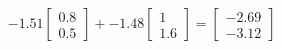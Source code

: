 \documentclass[preview]{standalone}
\begin{document}
\begin{align*}
-1.51 \begin{bmatrix} 0.8 \\ 0.5 \end{bmatrix} + -1.48 \begin{bmatrix} 1 \\ 1.6 \end{bmatrix} = \begin{bmatrix} -2.69 \\ -3.12 \end{bmatrix}
\end{align*}
\end{document}
